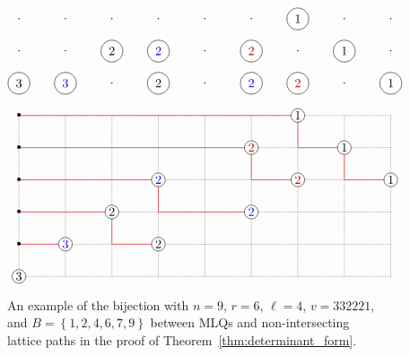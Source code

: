 \documentclass[reqno]{amsart}
\newcommand{\0}{\phantom{c}}
\newcommand{\set}[1]{\left\{ #1 \right\}}
\theoremstyle{plain}
\theoremstyle{definition}
\numberwithin{equation}{section}
\begin{document}
\begin{figure}[t]
\[
\begin{tikzpicture}[xscale=1.3,yscale=0.9]
  \begin{scope}[yshift=7cm]
    \foreach \i in {1,...,9}{
      \foreach \j in {0,1,2}{
        \node at (\i,\j){$\cdot$};
      }
    }
    \node[circle,fill=white,draw=black] at  (1, 0){$3$};
    \node[circle,fill=white,draw=black,text=blue] at  (2, 0){$3$};
    \node[circle,fill=white,draw=black] at  (4, 0){$2$};
    \node[circle,fill=white,draw=black,text=blue] at  (6, 0){$2$};
    \node[circle,fill=white,draw=black,text=darkred] at  (7, 0){$2$};
    \node[circle,fill=white,draw=black] at  (9, 0){$1$};
    \node[circle,fill=white,draw=black] at  (3, 1){$2$};
    \node[circle,fill=white,draw=black,text=blue] at  (4, 1){$2$};
    \node[circle,fill=white,draw=black,text=darkred] at  (6, 1){$2$};
    \node[circle,fill=white,draw=black] at  (8, 1){$1$};
    \node[circle,fill=white,draw=black] at  (7, 2){$1$};
  \end{scope}

  \draw[densely dotted] (1,1) grid (9,6);

  \draw[draw=red] (1,2)--(2,2);
  \draw[draw=red] (1,3)--(3,3)--(3,2)--(4,2);
  \draw[draw=red] (1,4)--(4,4)--(4,3)--(6,3);
  \draw[draw=red] (1,5)--(6,5)--(6,4)--(7,4);
  \draw[draw=red] (1,6)--(7,6)--(7,5)--(8,5)--(8,4)--(9,4);
  
  \node[circle,fill=white,draw=black,inner sep=1pt] at (1,1) {$3$};
  \node[circle,fill=white,draw=black,text=blue,inner sep=1pt] at (2,2) {$3$};
  \node[circle,fill=white,draw=black,inner sep=1pt] at (4,2) {$2$};
  \node[circle,fill=white,draw=black,inner sep=1pt] at (3,3) {$2$};
  \node[circle,fill=white,draw=black,text=blue,inner sep=1pt] at (4,4) {$2$};
  \node[circle,fill=white,draw=black,text=blue,inner sep=1pt] at (6,3) {$2$};
  \node[circle,fill=white,draw=black,text=darkred,inner sep=1pt] at (6,5) {$2$};
  \node[circle,fill=white,draw=black,text=darkred,inner sep=1pt] at (7,4) {$2$};
  \node[circle,fill=white,draw=black,inner sep=1pt] at (7,6) {$1$};
  \node[circle,fill=white,draw=black,inner sep=1pt] at (8,5) {$1$};
  \node[circle,fill=white,draw=black,inner sep=1pt] at (9,4) {$1$};

  \foreach \i in {2,...,6} {
    \node at (1,\i){\textbullet};
  }
\end{tikzpicture}
\]
\caption{An example of the bijection with $n = 9$, $r = 6$, $\ell = 4$, $v = 332221$, and $B = \set{1,2,4,6,7,9}$ between MLQs and non-intersecting lattice paths in the proof of Theorem~\ref{thm:determinant_form}.}
\label{fig:lattice_path_bijection}
\end{figure}
\end{document}
